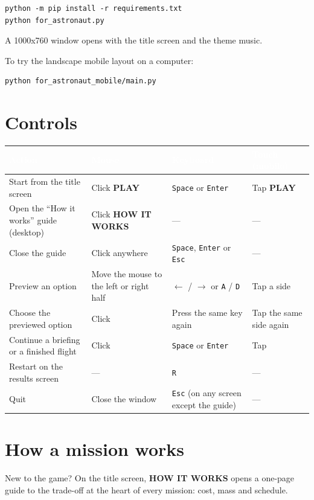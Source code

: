 \documentclass[11pt,a4paper]{article}
\newcommand{\key}[1]{\texttt{#1}}
\newcommand{\hd}[1]{\textcolor{white}{\textbf{#1}}}   %
\begin{document}
\begin{Verbatim}
python -m pip install -r requirements.txt
python for_astronaut.py
\end{Verbatim}

A 1000x760 window opens with the title screen and the theme music.

To try the landscape mobile layout on a computer:

\begin{Verbatim}
python for_astronaut_mobile/main.py
\end{Verbatim}

\section{Controls}

\begin{tabularx}{\textwidth}{@{}LLLL@{}}
\toprule
{}\hd{Action} & \hd{Mouse} & \hd{Keyboard} & \hd{Touch (mobile)} \\
\midrule
Start from the title screen & Click \textbf{PLAY} & \key{Space} or \key{Enter} & Tap \textbf{PLAY} \\
Open the ``How it works'' guide (desktop) & Click \textbf{HOW IT WORKS} & --- & --- \\
Close the guide & Click anywhere & \key{Space}, \key{Enter} or \key{Esc} & --- \\
Preview an option & Move the mouse to the left or right half & $\leftarrow$ / $\rightarrow$ or \key{A} / \key{D} & Tap a side \\
Choose the previewed option & Click & Press the same key again & Tap the same side again \\
Continue a briefing or a finished flight & Click & \key{Space} or \key{Enter} & Tap \\
Restart on the results screen & --- & \key{R} & --- \\
Quit & Close the window & \key{Esc} (on any screen except the guide) & --- \\
\bottomrule
\end{tabularx}

\section{How a mission works}

New to the game? On the title screen, \textbf{HOW IT WORKS} opens a one-page
guide to the trade-off at the heart of every mission: cost, mass and schedule.
\end{document}

